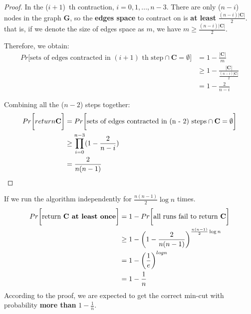 \documentclass[a4paper, 12pt, titlepage]{article}
\newtheorem{proof}{Proof}
\begin{document}
\begin{proof}

In the ($i + 1$)~th contraction, $i = 0, 1, ..., n - 3$. There are only ({$n - i$}) nodes in the graph \textbf{G}, so the \textbf{edges space} to contract on is \textbf{at least} $\frac{(n - i)|\textbf{C}|}{2}$.
that is, if we denote the size of edges space as $ m $, we have $ m \geq \frac{(n - i) |\textbf{C}|}{2} $. 

Therefore, we obtain:
\begin{equation}
    \begin{aligned}
    Pr \bigg[ \text{sets of edges contracted in $(i + 1)$~th step} \cap \textbf{C} = \emptyset \bigg] &= 1 - \frac{|\textbf{C}|}{m} \\
                                                                                                      &\geq 1 - \frac{|\textbf{C}|}{\frac{(n - i) |\textbf{C}|}{2}} \\
                                                                                                      &= 1 - \frac{2}{n -i}
    \end{aligned}
\end{equation}

Combining all the ($n - 2$) steps together:
\begin{equation}\label{eq: eq2}
    \begin{aligned}
    Pr \bigg[ return \text{\textbf{C}} \bigg] &= Pr \bigg[ \text{sets of edges contracted in (n - 2) steps} \cap \textbf{C} = \emptyset \bigg] \\
                                                    &\geq \prod_{i = 0}^{n - 3} (1 - \frac{2}{n - i}) \\
                                                    &= \frac{2}{n ( n - 1)}
    \end{aligned}
\end{equation}

\end{proof}

If we run the algorithm independently for $\frac{n (n - 1)}{2} \log n$ times.
\begin{equation}
    \begin{aligned}
        Pr \bigg[ \text{return \textbf{C at least once}} \bigg] &= 1 - Pr \bigg[ \text{all runs fail to return \textbf{C}} \bigg] \\
                                                                           &\geq 1 - \bigg( 1 - \frac{2}{n ( n - 1)} \bigg)^{\frac{n (n - 1)}{2} \log n} \\
                                                                           &= 1 - \bigg( \frac{1}{e} \bigg)^{log n} \\
                                                                           &= 1 - \frac{1}{n}
    \end{aligned}
\end{equation}
According to the proof, we are expected to get the correct min-cut with probability \textbf{more than} $1 - \frac{1}{n}$.
\end{document}
